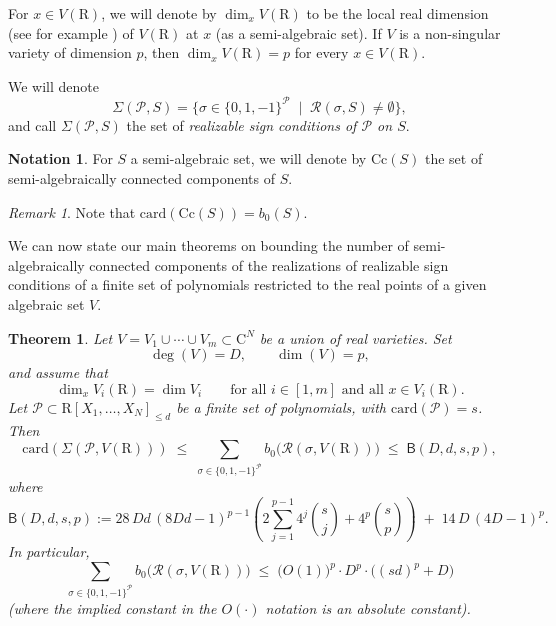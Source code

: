 \documentclass[10pt]{amsart}
\newtheorem{theorem}{Theorem}
\theoremstyle{definition}
\newtheorem{notation}{Notation}[section]
\theoremstyle{remark}
\newtheorem{remark}{Remark}
\numberwithin{equation}{section}
\newcommand {\R} {\mathrm{R}}
\newcommand {\C}     {\mathrm{C}}
\newcommand {\RR} {{\mathcal R}}
\newcommand{\card}{\mathrm{card}}
\newcommand{\Cc}{\mathrm{Cc}}
\begin{document}
For $x \in V(\R)$, we will denote by $\dim_x V(\R)$ to be the local 
real dimension (see for example \cite[page 191]{BPRbook2})
of $V(\R)$ at $x$  (as a semi-algebraic set). If $V$ is a non-singular variety of dimension $p$, then $\dim_x V(\R) = p$ for every $x \in V(\R)$. 

We will denote
\[
\Sigma(\mathcal{P},S) = \{\sigma \in \{0,1,-1\}^{\mathcal{P}} \;\mid\; \RR(\sigma,S) \neq \emptyset \},
\]
and call $\Sigma(\mathcal{P},S)$ the set of \emph{realizable sign conditions of $\mathcal{P}$ on $S$}.


\begin{notation}
    For $S$ a semi-algebraic set, we will denote by $\Cc(S)$ the set
    of semi-algebraically connected components of $S$. 
\end{notation}

\begin{remark}
    Note that 
    $\card(\Cc(S)) = b_0(S)$.
\end{remark}

We can now state our main theorems on bounding the number of semi-algebraically connected components of the realizations of realizable sign conditions of a finite set of polynomials restricted to the real points of a given algebraic set $V$.



\begin{theorem}
\label{thm:main:ordered:a}
Let $V=V_1\cup\cdots\cup V_m\subset \C^N$ be a union of real varieties.  Set
\[
\deg(V)=D,\qquad \dim(V)=p,
\]
and assume that
\[
\dim_x V_i(\R)=\dim V_i\qquad \text{for all }i\in[1,m]\text{ and all }x\in V_i(\R).
\]
Let $\mathcal P\subset \R[X_1,\ldots,X_N]_{\le d}$ be a finite set of polynomials, with $\card(\mathcal P)=s$.
Then
\begin{equation}\label{eq:thm-main-ordered-a}
\card(\Sigma(\mathcal P,V(\R)))
\;\le\;
\sum_{\sigma\in\{0,1,-1\}^{\mathcal P}} b_0\bigl(\RR(\sigma,V(\R))\bigr)
\;\le\;
\mathsf{B}(D,d,s,p),
\end{equation}
where
\[
\mathsf{B}(D,d,s,p)
:=
28\,Dd\,(8Dd-1)^{p-1}\!\left(2\sum_{j=1}^{p-1}4^j\binom{s}{j}+ 4^p\binom{s}{p}\right)
\;+\;
14\,D\,(4D-1)^p .
\]
In particular,
\[
\sum_{\sigma\in\{0,1,-1\}^{\mathcal P}} b_0\bigl(\RR(\sigma,V(\R))\bigr)
\;\le\;
\bigl(O(1)\bigr)^p \cdot D^p \cdot  \bigl((sd)^p + D\bigr)
\]
(where the implied constant in the $O(\cdot)$ notation is an absolute constant).
\end{theorem}
\end{document}
